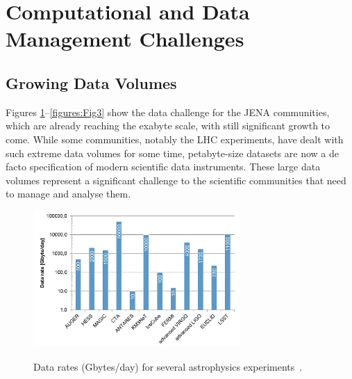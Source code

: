 \section{Computational and Data Management Challenges}

\subsection{Growing Data Volumes}

Figures \ref{figures:Fig1}--\ref{figures:Fig3} show the data challenge for the JENA communities, which are already reaching the exabyte scale, with still significant growth to come. While some communities, notably the LHC experiments, have dealt with such extreme data volumes for some time, petabyte-size datasets are now a de facto specification of modern scientific data instruments.  These large data volumes represent a significant challenge to the scientific communities that need to manage and analyse them.

\begin{figure}[htbp]
\begin{center}
\includegraphics[width=0.7\textwidth]{figures/Figure1} \\ 
\caption{Data rates (Gbytes/day) for several astrophysics experiments~\cite{berghöfer2015modelcomputingeuropeanastroparticle}.}
\label{figures:Fig1}
\end{center}
\end{figure}


